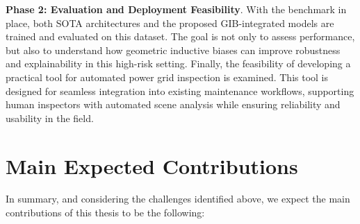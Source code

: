 \textbf{Phase 2: Evaluation and Deployment Feasibility}.
With the benchmark in place, both SOTA architectures and the proposed GIB-integrated models are trained and evaluated on this dataset.
The goal is not only to assess performance, but also to understand how geometric inductive biases can improve robustness and explainability in this high-risk setting.
%
Finally, the feasibility of developing a practical tool for automated power
grid inspection is examined. This tool is designed for seamless integration
into existing maintenance workflows, supporting human inspectors with automated
scene analysis while ensuring reliability and usability in the field.

\section{Main Expected Contributions}

In summary, and considering the challenges identified above, we expect the main
contributions of this thesis to be the following:

